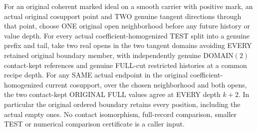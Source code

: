 \begin{theorem}
\label{hir:original-bound-two-contact-direction-full-values}
\leanok
For an original coherent marked ideal on a smooth carrier with positive
mark, an actual original cosupport point and TWO genuine tangent directions
through that point, choose ONE original open neighborhood before any
future history or value depth. For every actual coefficient-homogenized
TEST split into a genuine prefix and tail, take two real opens in the two
tangent domains avoiding EVERY retained original boundary member, with
independently genuine DOMAIN$(2)$ contact-kept references and genuine
FULL-cut restricted histories at a common recipe depth. For any SAME
actual endpoint in the original coefficient-homogenized current cosupport,
over the chosen neighborhood and both opens, the two contact-kept
ORIGINAL FULL values agree at EVERY depth $k+2$. In particular the original
ordered boundary retains every position, including the actual empty ones.
No contact isomorphism, full-record comparison, smaller TEST or numerical
comparison certificate is a caller input.
\end{theorem}
